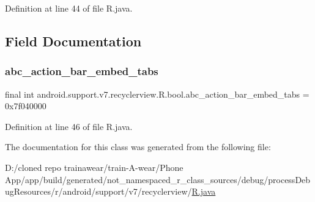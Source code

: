Definition at line 44 of file R.\+java.


\begin{DoxyCode}{0}

\end{DoxyCode}


\subsection{Field Documentation}
\mbox{\label{classandroid_1_1support_1_1v7_1_1recyclerview_1_1_r_1_1bool_a09daaf77c51bf57b0e10b5634f08e2c6}} 
\subsubsection{\texorpdfstring{abc\_action\_bar\_embed\_tabs}{abc\_action\_bar\_embed\_tabs}}
{\footnotesize\ttfamily final int android.\+support.\+v7.\+recyclerview.\+R.\+bool.\+abc\+\_\+action\+\_\+bar\+\_\+embed\+\_\+tabs = 0x7f040000\hspace{0.3cm}{\ttfamily [static]}}



Definition at line 46 of file R.\+java.



The documentation for this class was generated from the following file\+:\begin{DoxyCompactItemize}
\item 
D\+:/cloned repo trainawear/train-\/\+A-\/wear/\+Phone App/app/build/generated/not\+\_\+namespaced\+\_\+r\+\_\+class\+\_\+sources/debug/process\+Debug\+Resources/r/android/support/v7/recyclerview/\mbox{\hyperlink{process_debug_resources_2r_2android_2support_2v7_2recyclerview_2_r_8java}{R.\+java}}\end{DoxyCompactItemize}
